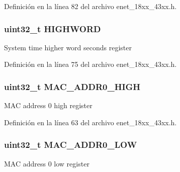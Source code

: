 Definición en la línea 82 del archivo enet\+\_\+18xx\+\_\+43xx.\+h.

\subsubsection[{\texorpdfstring{H\+I\+G\+H\+W\+O\+RD}{HIGHWORD}}]{ uint32\+\_\+t H\+I\+G\+H\+W\+O\+RD}\hypertarget{struct_l_p_c___e_n_e_t___t_abbb7740671d3871ab634235ab5717a78}{}\label{struct_l_p_c___e_n_e_t___t_abbb7740671d3871ab634235ab5717a78}
System time higher word seconds register 

Definición en la línea 75 del archivo enet\+\_\+18xx\+\_\+43xx.\+h.

\subsubsection[{\texorpdfstring{M\+A\+C\+\_\+\+A\+D\+D\+R0\+\_\+\+H\+I\+GH}{MAC_ADDR0_HIGH}}]{ uint32\+\_\+t M\+A\+C\+\_\+\+A\+D\+D\+R0\+\_\+\+H\+I\+GH}\hypertarget{struct_l_p_c___e_n_e_t___t_a32e472e346b959e30ee434c9d51999dd}{}\label{struct_l_p_c___e_n_e_t___t_a32e472e346b959e30ee434c9d51999dd}
M\+AC address 0 high register 

Definición en la línea 63 del archivo enet\+\_\+18xx\+\_\+43xx.\+h.

\subsubsection[{\texorpdfstring{M\+A\+C\+\_\+\+A\+D\+D\+R0\+\_\+\+L\+OW}{MAC_ADDR0_LOW}}]{ uint32\+\_\+t M\+A\+C\+\_\+\+A\+D\+D\+R0\+\_\+\+L\+OW}\hypertarget{struct_l_p_c___e_n_e_t___t_afe7b152952c2c359db31a4387e8aedb3}{}\label{struct_l_p_c___e_n_e_t___t_afe7b152952c2c359db31a4387e8aedb3}
M\+AC address 0 low register 

